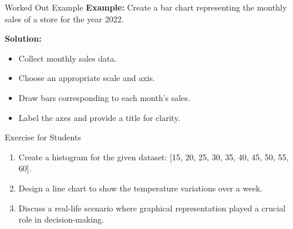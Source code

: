 \begin{frame}{Worked Out Example}
  \textbf{Example:} Create a bar chart representing the monthly sales of a store for the year 2022.

  \textbf{Solution:}
  \begin{itemize}
    \item Collect monthly sales data.
    \item Choose an appropriate scale and axis.
    \item Draw bars corresponding to each month's sales.
    \item Label the axes and provide a title for clarity.
  \end{itemize}
\end{frame}

\begin{frame}{Exercise for Students}
  \begin{enumerate}
    \item Create a histogram for the given dataset: [15, 20, 25, 30, 35, 40, 45, 50, 55, 60].
    \item Design a line chart to show the temperature variations over a week.
    \item Discuss a real-life scenario where graphical representation played a crucial role in decision-making.
  \end{enumerate}
\end{frame}


